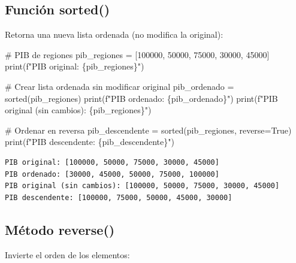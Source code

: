 \documentclass[
  doc,
  floatsintext,
  longtable,
  a4paper,
  nolmodern,
  notxfonts,
  notimes,
  12pt,
  colorlinks=true,linkcolor=blue,citecolor=blue,urlcolor=blue]{apa7}
\newenvironment{Shaded}{\begin{snugshade}}{\end{snugshade}}
\newcommand{\BuiltInTok}[1]{\textcolor[rgb]{0.00,0.23,0.31}{#1}}
\newcommand{\CommentTok}[1]{\textcolor[rgb]{0.37,0.37,0.37}{#1}}
\newcommand{\DecValTok}[1]{\textcolor[rgb]{0.68,0.00,0.00}{#1}}
\newcommand{\NormalTok}[1]{\textcolor[rgb]{0.00,0.23,0.31}{#1}}
\newcommand{\OperatorTok}[1]{\textcolor[rgb]{0.37,0.37,0.37}{#1}}
\newcommand{\SpecialCharTok}[1]{\textcolor[rgb]{0.37,0.37,0.37}{#1}}
\newcommand{\SpecialStringTok}[1]{\textcolor[rgb]{0.13,0.47,0.30}{#1}}
\newcommand{\VariableTok}[1]{\textcolor[rgb]{0.07,0.07,0.07}{#1}}
\begin{document}
\subsection{Función sorted()}\label{funciuxf3n-sorted}

Retorna una nueva lista ordenada (no modifica la original):

\begin{Shaded}
\begin{Highlighting}[]
\CommentTok{\# PIB de regiones}
\NormalTok{pib\_regiones }\OperatorTok{=}\NormalTok{ [}\DecValTok{100000}\NormalTok{, }\DecValTok{50000}\NormalTok{, }\DecValTok{75000}\NormalTok{, }\DecValTok{30000}\NormalTok{, }\DecValTok{45000}\NormalTok{]}
\BuiltInTok{print}\NormalTok{(}\SpecialStringTok{f"PIB original: }\SpecialCharTok{\{}\NormalTok{pib\_regiones}\SpecialCharTok{\}}\SpecialStringTok{"}\NormalTok{)}

\CommentTok{\# Crear lista ordenada sin modificar original}
\NormalTok{pib\_ordenado }\OperatorTok{=} \BuiltInTok{sorted}\NormalTok{(pib\_regiones)}
\BuiltInTok{print}\NormalTok{(}\SpecialStringTok{f"PIB ordenado: }\SpecialCharTok{\{}\NormalTok{pib\_ordenado}\SpecialCharTok{\}}\SpecialStringTok{"}\NormalTok{)}
\BuiltInTok{print}\NormalTok{(}\SpecialStringTok{f"PIB original (sin cambios): }\SpecialCharTok{\{}\NormalTok{pib\_regiones}\SpecialCharTok{\}}\SpecialStringTok{"}\NormalTok{)}

\CommentTok{\# Ordenar en reversa}
\NormalTok{pib\_descendente }\OperatorTok{=} \BuiltInTok{sorted}\NormalTok{(pib\_regiones, reverse}\OperatorTok{=}\VariableTok{True}\NormalTok{)}
\BuiltInTok{print}\NormalTok{(}\SpecialStringTok{f"PIB descendente: }\SpecialCharTok{\{}\NormalTok{pib\_descendente}\SpecialCharTok{\}}\SpecialStringTok{"}\NormalTok{)}
\end{Highlighting}
\end{Shaded}

\begin{verbatim}
PIB original: [100000, 50000, 75000, 30000, 45000]
PIB ordenado: [30000, 45000, 50000, 75000, 100000]
PIB original (sin cambios): [100000, 50000, 75000, 30000, 45000]
PIB descendente: [100000, 75000, 50000, 45000, 30000]
\end{verbatim}

\subsection{Método reverse()}\label{muxe9todo-reverse}

Invierte el orden de los elementos:
\end{document}
